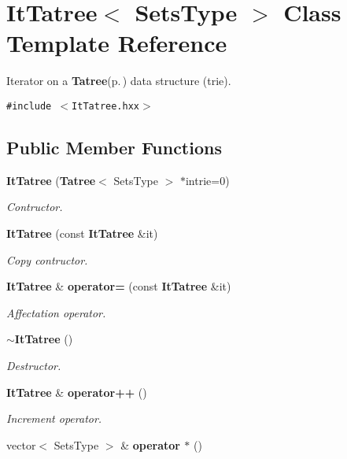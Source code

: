 \section{It\-Tatree$<$ Sets\-Type $>$ Class Template Reference}
\label{class_it_tatree}
Iterator on a {\bf Tatree}{\rm (p.\,\pageref{class_tatree})} data structure (trie).  


{\tt \#include $<$It\-Tatree.hxx$>$}

\subsection*{Public Member Functions}
\begin{CompactItemize}
\item 
{\bf It\-Tatree} ({\bf Tatree}$<$ Sets\-Type $>$ $\ast$intrie=0)
\begin{CompactList}\small\item\em Contructor. \item\end{CompactList}\item 
{\bf It\-Tatree} (const {\bf It\-Tatree} \&it)\label{class_it_tatree_f625511ae0b6e40ee162900c5114772b}

\begin{CompactList}\small\item\em Copy contructor. \item\end{CompactList}\item 
{\bf It\-Tatree} \& {\bf operator=} (const {\bf It\-Tatree} \&it)\label{class_it_tatree_c1b2d7adfcb64ccaa3023aad3fdaafda}

\begin{CompactList}\small\item\em Affectation operator. \item\end{CompactList}\item 
{\bf $\sim$It\-Tatree} ()\label{class_it_tatree_2c8cdc6723d5dd430893562a21ab0f27}

\begin{CompactList}\small\item\em Destructor. \item\end{CompactList}\item 
{\bf It\-Tatree} \& {\bf operator++} ()
\begin{CompactList}\small\item\em Increment operator. \item\end{CompactList}\item 
vector$<$ Sets\-Type $>$ \& {\bf operator $\ast$} ()\label{class_it_tatree_a8e7646cef7cea81b276c1fc76d9eea3}


\end{CompactItemize}
